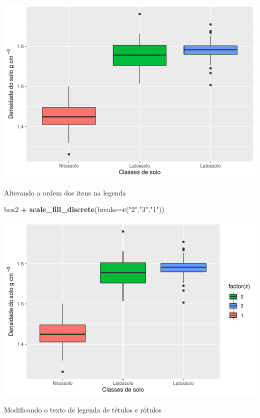 \documentclass[]{book}
\newenvironment{Shaded}{\begin{snugshade}}{\end{snugshade}}
\newcommand{\DataTypeTok}[1]{\textcolor[rgb]{0.13,0.29,0.53}{#1}}
\newcommand{\KeywordTok}[1]{\textcolor[rgb]{0.13,0.29,0.53}{\textbf{#1}}}
\newcommand{\NormalTok}[1]{#1}
\newcommand{\OperatorTok}[1]{\textcolor[rgb]{0.81,0.36,0.00}{\textbf{#1}}}
\newcommand{\StringTok}[1]{\textcolor[rgb]{0.31,0.60,0.02}{#1}}
\begin{document}
\includegraphics{TudodoR_files/figure-latex/unnamed-chunk-210-1.pdf}

Alterando a ordem dos itens na legenda

\begin{Shaded}
\begin{Highlighting}[]
\NormalTok{box2 }\OperatorTok{+}\StringTok{ }\KeywordTok{scale_fill_discrete}\NormalTok{(}\DataTypeTok{breaks=}\KeywordTok{c}\NormalTok{(}\StringTok{"2"}\NormalTok{,}\StringTok{"3"}\NormalTok{,}\StringTok{"1"}\NormalTok{))}
\end{Highlighting}
\end{Shaded}

\includegraphics{TudodoR_files/figure-latex/unnamed-chunk-211-1.pdf}

Modificando o texto de legenda de tétulos e rótulos
\end{document}
